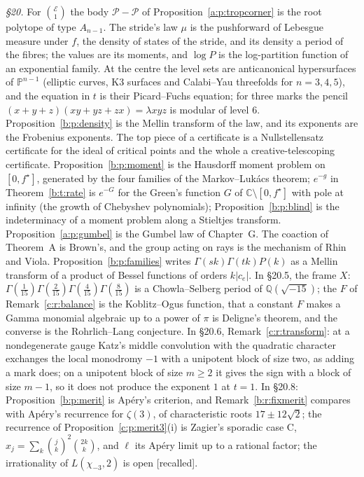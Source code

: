 \documentclass[11pt]{article}
\newcommand{\cE}{\mathcal E}
\theoremstyle{plain}
\theoremstyle{definition}
\theoremstyle{remark}
\newcommand{\recalled}{\textup{[recalled]}}
\begin{document}
\noindent\emph{\S20.} For $\binom{\cE}1$ the body $\mathcal P-\mathcal P$ of Proposition~\ref{a:p:tropcorner} is the root polytope of type $A_{n-1}$. The stride's law $\mu$ is the pushforward of Lebesgue measure under $f$, the density of states of the stride, and its density a period of the fibres; the values are its moments, and $\log P$ is the log-partition function of an exponential family. At the centre the level sets are anticanonical hypersurfaces of $\mathbb P^{n-1}$ (elliptic curves, K3 surfaces and Calabi--Yau threefolds for $n=3,4,5$), and the equation in $t$ is their Picard--Fuchs equation; for three marks the pencil $(x+y+z)(xy+yz+zx)=\lambda xyz$ is modular of level $6$. Proposition~\ref{b:p:density} is the Mellin transform of the law, and its exponents are the Frobenius exponents. The top piece of a certificate is a Nullstellensatz certificate for the ideal of critical points and the whole a creative-telescoping certificate. Proposition~\ref{b:p:moment} is the Hausdorff moment problem on $[0,f^\star]$, generated by the four families of the Markov--Luk\'acs theorem; $e^{-g}$ in Theorem~\ref{b:t:rate} is $e^{-G}$ for the Green's function $G$ of $\mathbb C\setminus[0,f^\star]$ with pole at infinity (the growth of Chebyshev polynomials); Proposition~\ref{b:p:blind} is the indeterminacy of a moment problem along a Stieltjes transform. Proposition~\ref{a:p:gumbel} is the Gumbel law of Chapter~G. The coaction of Theorem~A is Brown's, and the group acting on rays is the mechanism of Rhin and Viola. Proposition~\ref{b:p:families} writes $\Gamma(sk)\Gamma(tk)P(k)$ as a Mellin transform of a product of Bessel functions of orders $k|c_e|$. In \S20.5, the frame $X$: $\Gamma(\frac1{15})\Gamma(\frac2{15})\Gamma(\frac4{15})\Gamma(\frac8{15})$ is a Chowla--Selberg period of $\mathbb Q(\sqrt{-15})$; the $F$ of Remark~\ref{c:r:balance} is the Koblitz--Ogus function, that a constant $F$ makes a Gamma monomial algebraic up to a power of $\pi$ is Deligne's theorem, and the converse is the Rohrlich--Lang conjecture. In \S20.6, Remark~\ref{c:r:transform}: at a nondegenerate gauge Katz's middle convolution with the quadratic character exchanges the local monodromy $-1$ with a unipotent block of size two, as adding a mark does; on a unipotent block of size $m\ge2$ it gives the sign with a block of size $m-1$, so it does not produce the exponent $1$ at $t=1$. In \S20.8: Proposition~\ref{b:p:merit} is Ap\'ery's criterion, and Remark~\ref{b:r:fixmerit} compares with Ap\'ery's recurrence for $\zeta(3)$, of characteristic roots $17\pm12\sqrt2$; the recurrence of Proposition~\ref{c:p:merit3}(i) is Zagier's sporadic case C, $x_j=\sum_k\binom jk^2\binom{2k}k$, and $\ell$ its Ap\'ery limit up to a rational factor; the irrationality of $L(\chi_{-3},2)$ is open \recalled.
\end{document}
